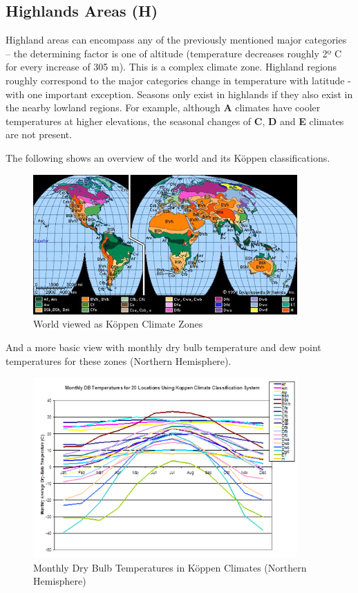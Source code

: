 \subsection{Highlands Areas (H)}\label{highlands-areas-h}

Highland areas can encompass any of the previously mentioned major categories -- the determining factor is one of altitude (temperature decreases roughly 2º C for every increase of 305 m). This is a complex climate zone. Highland regions roughly correspond to the major categories change in temperature with latitude - with one important exception. Seasons only exist in highlands if they also exist in the nearby lowland regions. For example, although \textbf{A} climates have cooler temperatures at higher elevations, the seasonal changes of \textbf{C}, \textbf{D} and \textbf{E} climates are not present.

The following shows an overview of the world and its Köppen classifications.

\begin{figure}[hbtp] %
\centering
\includegraphics[width=0.9\textwidth, height=0.9\textheight, keepaspectratio=true]{media/image010.jpg}
\caption{World viewed as Köppen Climate Zones \protect \label{fig:world-viewed-as-kppen-climate-zones}}
\end{figure}

And a more basic view with monthly dry bulb temperature and dew point temperatures for these zones (Northern Hemisphere).

\begin{figure}[hbtp] %
\centering
\includegraphics[width=0.9\textwidth, height=0.9\textheight, keepaspectratio=true]{media/image011.png}
\caption{Monthly Dry Bulb Temperatures in Köppen Climates (Northern Hemisphere) \protect \label{fig:monthly-dry-bulb-temperatures-in-kppen}}
\end{figure}

